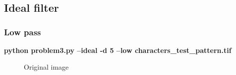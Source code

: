     \pagebreak
    \subsection{Ideal filter}

        \subsubsection{Low pass}

        \small{\textbf{python problem3.py --ideal -d 5 --low characters\_test\_pattern.tif}}

        \begin{figure}[!htb]\centering
            \begin{minipage}{0.45\textwidth}
                \caption{Original image}
            \end{minipage}
            \begin{minipage}{0.45\textwidth}

\end{minipage}
\end{figure}
